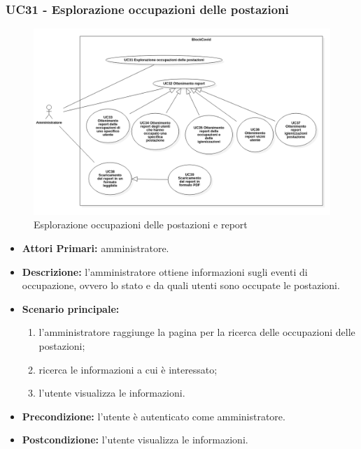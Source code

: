 \subsubsection{ UC31 - Esplorazione occupazioni delle postazioni}
\begin{figure}[H]
	\centering
	\includegraphics[width=18cm]{res/images/UC31-32-33-34-35-36-37-38-39.png}
	\caption{Esplorazione occupazioni delle postazioni e report}
	\label{fig:Esplorazione occupazioni delle postazioni e report}
\end{figure}
\begin{itemize}
	\item\textbf{Attori Primari:} 
	amministratore.
	\item\textbf{Descrizione:} 
	l'amministratore ottiene informazioni sugli eventi di occupazione, ovvero lo stato e da quali utenti sono occupate le postazioni.
	\item\textbf{Scenario principale:} 
	\begin{enumerate}
		\item l'amministratore raggiunge la pagina per la ricerca delle occupazioni delle postazioni;
		\item ricerca le informazioni a cui è interessato;
		\item l'utente visualizza le informazioni.
	\end{enumerate}	
	\item\textbf{Precondizione:} 
	l'utente è autenticato come amministratore.
	\item\textbf{Postcondizione:}
	l'utente visualizza le informazioni.
\end{itemize}

